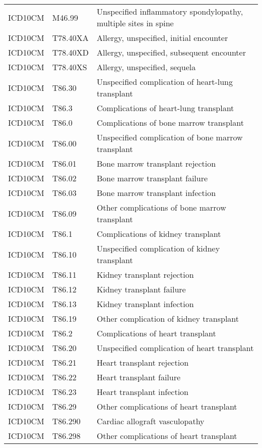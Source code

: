 \begin{longtable}{p{}p{}p{}}
  ICD10CM & M46.99 & Unspecified inflammatory spondylopathy, multiple sites in spine \\ 
  ICD10CM & T78.40XA & Allergy, unspecified, initial encounter \\ 
  ICD10CM & T78.40XD & Allergy, unspecified, subsequent encounter \\ 
  ICD10CM & T78.40XS & Allergy, unspecified, sequela \\ 
  ICD10CM & T86.30 & Unspecified complication of heart-lung transplant \\ 
  ICD10CM & T86.3 & Complications of heart-lung transplant \\ 
  ICD10CM & T86.0 & Complications of bone marrow transplant \\ 
  ICD10CM & T86.00 & Unspecified complication of bone marrow transplant \\ 
  ICD10CM & T86.01 & Bone marrow transplant rejection \\ 
  ICD10CM & T86.02 & Bone marrow transplant failure \\ 
  ICD10CM & T86.03 & Bone marrow transplant infection \\ 
  ICD10CM & T86.09 & Other complications of bone marrow transplant \\ 
  ICD10CM & T86.1 & Complications of kidney transplant \\ 
  ICD10CM & T86.10 & Unspecified complication of kidney transplant \\ 
  ICD10CM & T86.11 & Kidney transplant rejection \\ 
  ICD10CM & T86.12 & Kidney transplant failure \\ 
  ICD10CM & T86.13 & Kidney transplant infection \\ 
  ICD10CM & T86.19 & Other complication of kidney transplant \\ 
  ICD10CM & T86.2 & Complications of heart transplant \\ 
  ICD10CM & T86.20 & Unspecified complication of heart transplant \\ 
  ICD10CM & T86.21 & Heart transplant rejection \\ 
  ICD10CM & T86.22 & Heart transplant failure \\ 
  ICD10CM & T86.23 & Heart transplant infection \\ 
  ICD10CM & T86.29 & Other complications of heart transplant \\ 
  ICD10CM & T86.290 & Cardiac allograft vasculopathy \\ 
  ICD10CM & T86.298 & Other complications of heart transplant \\ 

\end{longtable}
